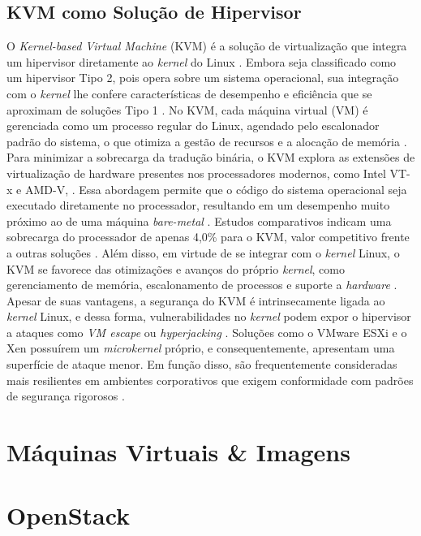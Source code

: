 \subsection{KVM como Solução de Hipervisor}

O \textit{Kernel-based Virtual Machine} (KVM) é a solução de virtualização que integra um hipervisor diretamente ao \textit{kernel} do Linux \cite{carrisimi2008}. Embora seja classificado como um hipervisor Tipo 2, pois opera sobre um sistema operacional, sua integração com o \textit{kernel} lhe confere características de desempenho e eficiência que se aproximam de soluções Tipo 1 \cite{chawla2025, kominos2017}. No KVM, cada máquina virtual (VM) é gerenciada como um processo regular do Linux, agendado pelo escalonador padrão do sistema, o que otimiza a gestão de recursos e a alocação de memória \cite{anand2013}.
Para minimizar a sobrecarga da tradução binária, o KVM explora as extensões de virtualização de hardware presentes nos processadores modernos, como Intel VT-x e AMD-V, \cite{chawla2025, carrisimi2008}. Essa abordagem permite que o código do sistema operacional seja executado diretamente no processador, resultando em um desempenho muito próximo ao de uma máquina \textit{bare-metal} \cite{kominos2017}. Estudos comparativos indicam uma sobrecarga do processador de apenas 4,0\% para o KVM, valor competitivo frente a outras soluções \cite{chawla2025}. Além disso, em virtude de se integrar com o \textit{kernel} Linux, o KVM se favorece das otimizações e avanços do próprio \textit{kernel}, como gerenciamento de memória, escalonamento de processos e suporte a \textit{hardware} \cite{anand2013, arora2014}. 
Apesar de suas vantagens, a segurança do KVM é intrinsecamente ligada ao \textit{kernel} Linux, e dessa forma, vulnerabilidades no \textit{kernel} podem expor o hipervisor a ataques como \textit{VM escape} ou \textit{hyperjacking} \cite{chawla2025}. Soluções como o VMware ESXi e o Xen possuírem um \textit{microkernel} próprio, e consequentemente, apresentam uma superfície de ataque menor. Em função disso, são frequentemente consideradas mais resilientes em ambientes corporativos que exigem conformidade com padrões de segurança rigorosos \cite{chawla2025}.

\section{Máquinas Virtuais \& Imagens}

\section{OpenStack}

